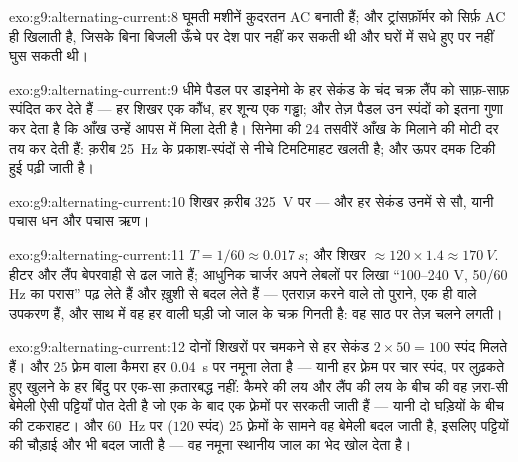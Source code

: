 \begin{solution}{exo:g9:alternating-current:8}
घूमती मशीनें क़ुदरतन AC बनाती हैं; और ट्रांसफ़ॉर्मर को सिर्फ़ AC ही
खिलाती है, जिसके बिना बिजली ऊँचे  पर देश पार नहीं कर सकती थी
और घरों में सधे हुए  पर नहीं घुस सकती थी।
\end{solution}

\begin{solution}{exo:g9:alternating-current:9}
धीमे पैडल पर डाइनेमो के हर सेकंड के चंद चक्र लैंप को साफ़-साफ़ स्पंदित
कर देते हैं --- हर शिखर एक कौंध, हर शून्य एक गड्ढा; और तेज़ पैडल उन
स्पंदों को इतना गुणा कर देता है कि आँख उन्हें आपस में मिला देती है।
सिनेमा की $24$ तसवीरें आँख के मिलाने की मोटी दर तय कर देती हैं: क़रीब
\qty{25}{Hz} के प्रकाश-स्पंदों से नीचे टिमटिमाहट खलती है; और ऊपर दमक
टिकी हुई पढ़ी जाती है।
\end{solution}

\begin{solution}{exo:g9:alternating-current:10}
शिखर क़रीब \qty{325}{V} पर --- और हर सेकंड उनमें से सौ, यानी पचास धन
और पचास ऋण।
\end{solution}

\begin{solution}{exo:g9:alternating-current:11}
$T = 1/60 \approx \qty{0.017}{s}$; और शिखर $\approx 120 \times 1.4
\approx \qty{170}{V}$. हीटर और लैंप बेपरवाही से ढल जाते हैं; आधुनिक
चार्जर अपने लेबलों पर लिखा ``100--240 V, 50/60 Hz का परास'' पढ़ लेते
हैं और ख़ुशी से
बदल लेते हैं --- एतराज़ करने वाले तो पुराने, एक ही  वाले उपकरण
हैं, और साथ में वह हर  वाली घड़ी जो जाल के चक्र गिनती है: वह साठ पर
तेज़ चलने लगती।
\end{solution}

\begin{solution}{exo:g9:alternating-current:12}
दोनों शिखरों पर चमकने से हर सेकंड $2 \times 50 = 100$ स्पंद मिलते हैं।
और $25$ फ़्रेम वाला कैमरा हर \qty{0.04}{s} पर नमूना लेता है --- यानी
हर फ़्रेम पर चार स्पंद, पर लुढ़कते हुए खुलने के हर बिंदु पर एक-सा
क़तारबद्ध नहीं: कैमरे की लय और लैंप की लय के बीच की वह ज़रा-सी बेमेली
ऐसी पट्टियाँ पोत देती है जो एक के बाद एक फ़्रेमों पर सरकती जाती हैं ---
यानी दो घड़ियों के बीच की टकराहट। और \qty{60}{Hz} पर ($120$ स्पंद) $25$
फ़्रेमों के सामने वह बेमेली बदल जाती है, इसलिए पट्टियों की चौड़ाई और
 भी बदल जाती है --- वह नमूना स्थानीय जाल का भेद खोल देता है।
\end{solution}

